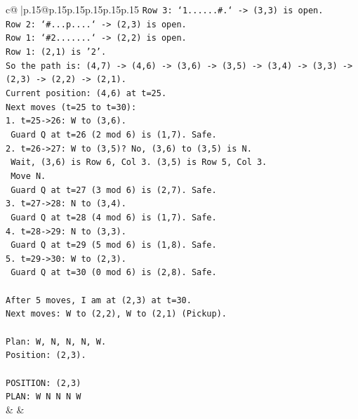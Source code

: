 \documentclass{article}
\begin{document}
{\begin{supertabular}{c@{$\;$}|p{.15\linewidth}@{}p{.15\linewidth}p{.15\linewidth}p{.15\linewidth}p{.15\linewidth}p{.15\linewidth}}
{{{\texttt{Row 3: `1......\#.` {-}> (3,3) is open.} \\
\texttt{Row 2: `\#...p....` {-}> (2,3) is open.} \\
\texttt{Row 1: `\#2.......` {-}> (2,2) is open.} \\
\texttt{Row 1: (2,1) is '2'.} \\
\texttt{So the path is: (4,7) {-}> (4,6) {-}> (3,6) {-}> (3,5) {-}> (3,4) {-}> (3,3) {-}> (2,3) {-}> (2,2) {-}> (2,1).} \\
\texttt{Current position: (4,6) at t=25.} \\
\texttt{Next moves (t=25 to t=30):} \\
\texttt{1. t=25{-}>26: W to (3,6).} \\
\texttt{   Guard Q at t=26 (2 mod 6) is (1,7). Safe.} \\
\texttt{2. t=26{-}>27: W to (3,5)? No, (3,6) to (3,5) is N.} \\
\texttt{   Wait, (3,6) is Row 6, Col 3. (3,5) is Row 5, Col 3.} \\
\texttt{   Move N.} \\
\texttt{   Guard Q at t=27 (3 mod 6) is (2,7). Safe.} \\
\texttt{3. t=27{-}>28: N to (3,4).} \\
\texttt{   Guard Q at t=28 (4 mod 6) is (1,7). Safe.} \\
\texttt{4. t=28{-}>29: N to (3,3).} \\
\texttt{   Guard Q at t=29 (5 mod 6) is (1,8). Safe.} \\
\texttt{5. t=29{-}>30: W to (2,3).} \\
\texttt{   Guard Q at t=30 (0 mod 6) is (2,8). Safe.} \\
\\ 
\texttt{After 5 moves, I am at (2,3) at t=30.} \\
\texttt{Next moves: W to (2,2), W to (2,1) (Pickup).} \\
\\ 
\texttt{Plan: W, N, N, N, W.} \\
\texttt{Position: (2,3).} \\
\\ 
\texttt{POSITION: (2,3)} \\
\texttt{PLAN: W N N N W} \\
            }
        }
    }
    & & \\ \\


\end{supertabular}}
\end{document}
